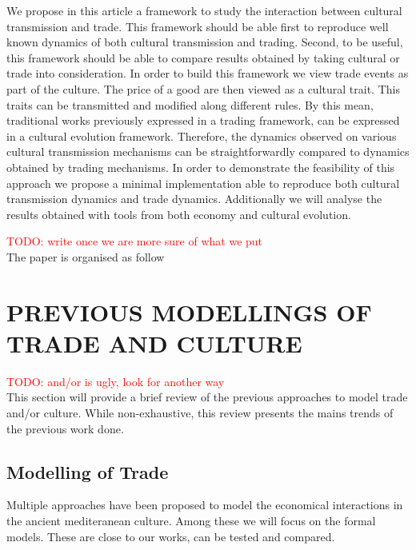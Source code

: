 \documentclass{wscpaperproc}
\newcommand{\memo}[2]{\textcolor{#1}{#2}}
\newcommand{\todo}[1]{\memo{red}{TODO: #1\\}}
\begin{document}
We propose in this article a framework to study the interaction between cultural transmission and trade. This framework should be able first to reproduce well known dynamics of both cultural transmission and trading. Second, to be useful, this framework should be able to compare results obtained by taking cultural or trade into consideration. In order to build this framework we view trade events as part of the culture. The price of a good are then viewed as a cultural trait. This traits can be transmitted and modified along different rules. By this mean, traditional works previously expressed in a trading framework, can be expressed in a cultural evolution framework. Therefore, the dynamics observed on various cultural transmission mechanisms can be straightforwardly compared to dynamics obtained by trading mechanisms. In order to demonstrate the feasibility of this approach we propose a minimal implementation able to reproduce both cultural transmission dynamics and trade dynamics. Additionally we will analyse the results obtained with tools from both economy and cultural evolution.




\todo{write once we are more sure of what we put}
The paper is organised as follow

\section{PREVIOUS MODELLINGS OF TRADE AND CULTURE}

\todo{and/or is ugly, look for another way}
This section will provide a brief review of the previous approaches to model trade and/or culture. While non-exhaustive, this review presents the mains trends of the previous work done.

\subsection{Modelling of Trade}

Multiple approaches have been proposed to model the economical interactions in the ancient mediteranean culture. Among these we will focus on the formal models. These are close to our works, can be tested and compared.

\end{document}
